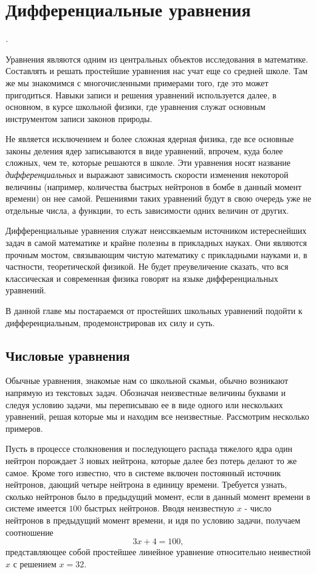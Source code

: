 \chapter{Дифференциальные уравнения}\label{ch:differenrial_equations}

\epigraph{\emph{.}}{}

Уравнения являются одним из центральных объектов исследования в математике.
Составлять и решать простейшие уравнения нас учат еще со средней школе.
Там же мы знакомимся с многочисленными примерами того, где это может пригодиться.
Навыки записи и решения уравнений используется далее, в основном, в курсе школьной физики, где уравнения служат основным инструментом записи законов природы.

Не является исключением и более сложная ядерная физика, где все основные законы деления ядер записываются в виде уравнений, впрочем, куда более сложных, чем те, которые решаются в школе.
Эти уравнения носят название \textit{дифференциальных} и выражают зависимость скорости изменения некоторой величины (например, количества быстрых нейтронов в бомбе в данный момент времени) он нее самой. 
Решениями таких уравнений будут в свою очередь уже не отдельные числа, а функции, то есть зависимости одних величин от других.

Дифференциальные уравнения служат неиссякаемым источником истереснейших задач в самой математике и крайне полезны в прикладных науках. 
Они являются прочным мостом, связывающим чистую математику с прикладными науками и, в частности, теоретической физикой. 
Не будет преувеличение сказать, что вся классическая и современная физика говорят на языке дифференциальных уравнений.

В данной главе мы постараемся от простейших школьных уравнений подойти к дифференциальным, продемонстрировав их силу и суть. 


\section*{Числовые уравнения} 

Обычные уравнения, знакомые нам со школьной скамьи, обычно возникают напрямую из текстовых задач.
Обозначая неизвестные величины буквами и следуя условию задачи, мы переписываю ее в виде одного или нескольких уравнений, решая которые мы и находим все неизвестные.
Рассмотрим несколько примеров.

Пусть в процессе столкновения и последующего распада тяжелого ядра один нейтрон порождает $3$ новых нейтрона, которые далее без потерь делают то же самое.
Кроме того известно, что в системе включен постоянный источник нейтронов, дающий четыре нейтрона в единицу времени.
Требуется узнать, сколько нейтронов было в предыдущий момент, если в данный момент времени в системе имеется $100$ быстрых нейтронов.
Вводя неизвестную $x$ - число нейтронов в предыдущий момент времени, и идя по условию задачи, получаем соотношение
$$
3x + 4 = 100,
$$
представляющее собой простейшее линейное уравнение относительно неивестной $x$ с решением $x = 32$.

